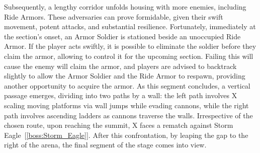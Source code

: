Subsequently, a lengthy corridor unfolds housing with more enemies, including Ride Armors. These adversaries can prove formidable, given their swift movement, potent attacks, and substantial resilience. Fortunately, immediately at the section's onset, an Armor Soldier is stationed beside an unoccupied Ride Armor. If the player acts swiftly, it is possible to eliminate the soldier before they claim the armor, allowing to control it for the upcoming section. Failing this will cause the enemy will claim the armor, and players are advised to backtrack slightly to allow the Armor Soldier and the Ride Armor to respawn, providing another opportunity to acquire the armor. As this segment concludes, a vertical passage emerges, dividing into two paths by a wall: the left path involves X scaling moving platforms via wall jumps while evading cannons, while the right path involves ascending ladders as cannons traverse the walls. Irrespective of the chosen route, upon reaching the summit, X faces a rematch against Storm Eagle~[\ref{boss:Storm_Eagle}]. After this confrontation, by leaping the gap to the right of the arena, the final segment of the stage comes into view.

